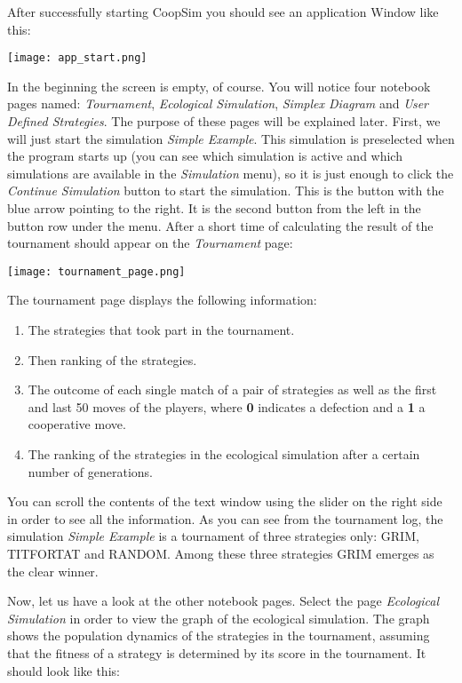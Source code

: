 \documentclass[12pt,a4paper,USenglish]{article}
\begin{document}
After successfully starting CoopSim you should see an application
Window like this:

\begin{center}\texttt{[image: app\_start.png]}\end{center}

In the beginning the screen is empty, of course. You will notice four notebook
pages named: \emph{Tournament}, \emph{Ecological Simulation}, \emph{Simplex
  Diagram} and \emph{User Defined Strategies}. The purpose of these pages will
be explained later. First, we will just start the simulation \emph{Simple
  Example}. This simulation is preselected when the program starts up (you can
see which simulation is active and which simulations are available in the
\emph{Simulation} menu), so it is just enough to click the \emph{Continue
  Simulation} button to start the simulation. This is the button with the
blue arrow pointing to the right. It is the second button from the left
in the button row under the menu. After a short time of calculating the result
of the tournament should appear on the \emph{Tournament} page:

\begin{center}\texttt{[image: tournament\_page.png]}\end{center}

The tournament page displays the following information:

\begin{enumerate}
\item The strategies that took part in the tournament.
\item Then ranking of the strategies.
\item The outcome of each single match of a pair of strategies as well as
the first and last 50 moves of the players, where {\bf 0} indicates a defection
and a {\bf 1} a cooperative move.
\item The ranking of the strategies in the ecological simulation after a
certain number of generations.
\end{enumerate}

You can scroll the contents of the text window using the slider on the
right side in order to see all the information. As you can see from the
tournament log, the simulation \emph{Simple Example} is a tournament
of three strategies only: GRIM, TITFORTAT and RANDOM. Among these
three strategies GRIM emerges as the clear winner.

Now, let us have a look at the other notebook pages. Select the page
\emph{Ecological Simulation} in order to view the graph of the ecological
simulation. The graph shows the population dynamics of the strategies
in the tournament, assuming that the fitness of a strategy is
determined by its score in the tournament. It should look like this:
\end{document}
